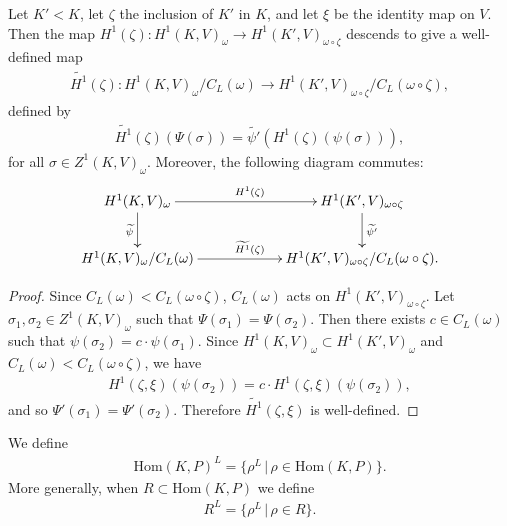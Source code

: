 \begin{lemma} Let $K' < K$, let $\zeta$ the inclusion of $K'$ in $K$, and let $\xi$ be the identity map on $V$. Then the map $H^1(\zeta):H^1(K, V)_\omega \rightarrow H^1(K', V)_{\omega\circ\zeta}$ descends to give a well-defined map
	\begin{align*}
		\widetilde{H^1}(\zeta): H^1(K, V)_\omega/C_L(\omega) \rightarrow H^1(K', V)_{\omega\circ\zeta}/C_L(\omega\circ \zeta),
	\end{align*}
defined by
	\begin{align*}
		\widetilde{H^1}(\zeta)(\Psi(\sigma)) = \widetilde{\psi'}\left(H^1(\zeta)(\psi(\sigma))\right),
	\end{align*}
for all $\sigma\in Z^1(K, V)_\omega$.
Moreover, the following diagram commutes:
  \begin{align*}
    \xymatrix@C=60pt{
		H^1(K, V)_\omega \ar[r]^{H^1(\zeta)} \ar[d]_{\widetilde{\psi}} & H^1(K', V)_{\omega\circ\zeta} \ar[d]^{\widetilde{\psi'}} \\
		H^1(K, V)_\omega/C_L(\omega) \ar[r]^{\widetilde{H^1}(\zeta)} & {H^1(K', V)_{\omega\circ\zeta}/C_L(\omega\circ\zeta)}.
    }
  \end{align*}
\end{lemma}
\begin{proof}
Since $C_L(\omega) < C_L(\omega\circ\zeta)$, $C_L(\omega)$ acts on $H^1(K', V)_{\omega\circ\zeta}$. 
	Let $\sigma_1, \sigma_2 \in Z^1(K, V)_\omega$ such that $\Psi(\sigma_1) = \Psi(\sigma_2)$. Then there exists $c \in C_L(\omega)$ such that $\psi(\sigma_2) = c \cdot \psi(\sigma_1)$. Since $H^1(K, V)_\omega \subset H^1(K', V)_\omega$ and $C_L(\omega) < C_L(\omega\circ\zeta)$, we have
	\begin{align*}
		H^1(\zeta, \xi)\left(\psi(\sigma_2)\right) = c \cdot H^1(\zeta, \xi)\left(\psi(\sigma_2)\right),
	\end{align*}
	and so $\Psi'(\sigma_1) = \Psi'(\sigma_2)$. Therefore $\widetilde{H^1}(\zeta, \xi)$ is well-defined.
\end{proof}

\begin{definition} We define
	\begin{align*}
		\mathrm{Hom}(K, P)^L = \{\rho^L\,|\,\rho \in \mathrm{Hom}(K, P)\}.
	\end{align*}
	More generally, when $R \subset \mathrm{Hom}(K, P)$ we define
	\begin{align*}
		R^L = \{\rho^L\,|\,\rho \in R\}.
	\end{align*}
\end{definition}

